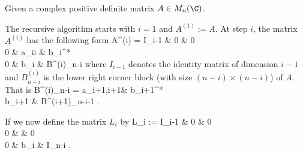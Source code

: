 

\begin{algorithm}
Given a complex positive definite matrix $A\in M_n(\C)$. 

The recursive algorithm starts with $i =1$ and $A^{(1)} :=A$. At step $i$, the matrix $A^{(i)}$ has the following form
\be
A^{(i)} = \bepm
I_{i-1} & 0 & 0\\
0 & a_{ii} & b_i^* \\
0 & b_i & B^{(i)}_{n-i}
\eepm
\ee
where $I_{i-1}$ denotes the identity matrix of dimension $i-1$ and $B^{(i)}_{n-i}$ is the lower right corner block (with size $(n-i)\times (n-i)$) of $A$. That is
\be
B^{(i)}_{n-i} = \bepm
a_{i+1,i+1}& b_{i+1}^* \\
b_{i+1} & B^{(i+1)}_{n-i-1}
\eepm.
\ee

If we now define the matrix $L_i$ by
\be
L_i := \bepm
I_{i-1} & 0 & 0 \\
0 &  & 0 \\
0 & b_i & I_{n-i}
\eepm.
\ee


\end{algorithm}
